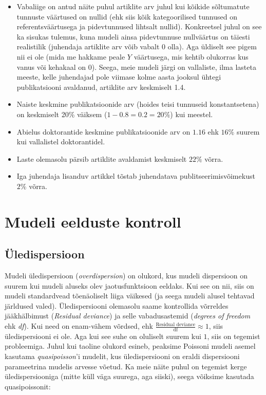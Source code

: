 \documentclass[
]{book}
\providecommand{\tightlist}{%
  \setlength{\itemsep}{0pt}\setlength{\parskip}{0pt}}
\begin{document}
\begin{itemize}
\tightlist
\item
  Vabaliige on antud näite puhul artiklite arv juhul kui kõikide sõltumatute tunnuste väärtused on nullid (ehk siis kõik kategoorilised tunnused on referentsväärtusega ja pidevtunnused lihtsalt nullid). Konkreetsel juhul on see ka sisukas tulemus, kuna mudeli ainsa pidevtunnuse nullväärtus on täiesti realistilik (juhendaja artiklite arv võib vabalt \(0\) olla). Aga üldiselt see pigem nii ei ole (mida me hakkame peale \(Y\) väärtusega, mis kehtib olukorras kus vanus või kehakaal on \(0\)). Seega, meie mudeli järgi on vallaliste, ilma lasteta meeste, kelle juhendajad pole viimase kolme aasta jooksul ühtegi publikatsiooni avaldanud, artiklite arv keskmiselt 1.4.
\item
  Naiste keskmine publikatsioonide arv (hoides teisi tunnuseid konstantsetena) on keskmiselt 20\% väiksem (\(1-0.8 = 0.2 = 20\%\)) kui meestel.
\item
  Abielus doktorantide keskmine publikatsioonide arv on \(1.16\) ehk \(16\%\) suurem kui vallalistel doktorantidel.
\item
  Laste olemasolu pärsib artiklite avaldamist keskmiselt \(22\%\) võrra.
\item
  Iga juhendaja lisanduv artikkel tõstab juhendatava publitseerimisvõimekust \(2\%\) võrra.
\end{itemize}

\hypertarget{mudeli-eelduste-kontroll}{%
\section{Mudeli eelduste kontroll}\label{mudeli-eelduste-kontroll}}

\hypertarget{uxfcledispersioon}{%
\subsection{Üledispersioon}\label{uxfcledispersioon}}

Mudeli üledispersioon (\emph{overdispersion}) on olukord, kus mudeli dispersioon on suurem kui mudeli aluseks olev jaotusfunktsioon eeldaks. Kui see on nii, siis on mudeli standardvead tõenäoliselt liiga väikesed (ja seega mudeli alusel tehtavad järldused valed). Üledispersiooni olemasolu saame kontrollida võrreldes jääkhälbimust (\emph{Residual deviance}) ja selle vabadusastemid (\emph{degrees of freedom} ehk \emph{df}). Kui need on enam-vähem võrdsed, ehk \(\frac{\text{Residual deviance}}{\text{df}} \approx 1\), siis üledispersiooni ei ole. Aga kui see suhe on oluliselt suurem kui \(1\), siis on tegemist probleemiga. Juhul kui taoline olukord esineb, peaksime Poissoni mudeli asemel kasutama \emph{quasipoisson}'i mudelit, kus üledispersiooni on eraldi dispersiooni parameetrina mudelis arvesse võetud. Ka meie näite puhul on tegemist kerge üledispersiooniga (mitte küll väga suurega, aga siiski), seega võiksime kasutada quasipoissonit:
\end{document}
